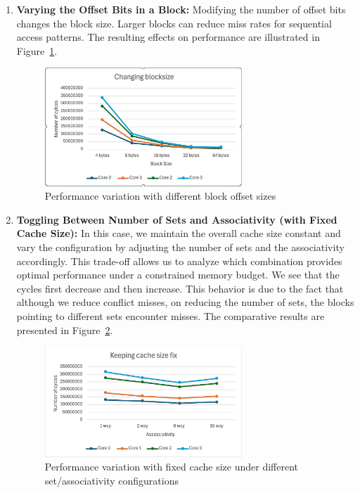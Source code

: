 \documentclass{article}
\begin{document}
\begin{enumerate}
    \item \textbf{Varying the Offset Bits in a Block:} Modifying the number of offset bits changes the block size. Larger blocks can reduce miss rates for sequential access patterns. The resulting effects on performance are illustrated in Figure~\ref{fig:offset_variation}.
    
    \begin{figure}[H]
        \centering
        \includegraphics[width=0.7\textwidth]{3.jpeg}
        \caption{Performance variation with different block offset sizes}
        \label{fig:offset_variation}
    \end{figure}

    \item \textbf{Toggling Between Number of Sets and Associativity (with Fixed Cache Size):} In this case, we maintain the overall cache size constant and vary the configuration by adjusting the number of sets and the associativity accordingly. This trade-off allows us to analyze which combination provides optimal performance under a constrained memory budget. We see that the cycles first decrease and then increase. This behavior is due to the fact that although we reduce conflict misses, on reducing the number of sets, the blocks pointing to different sets encounter misses. The comparative results are presented in Figure~\ref{fig:fixed_size_variation}.
    
    \begin{figure}[H]
        \centering
        \includegraphics[width=0.7\textwidth]{4.jpeg}
        \caption{Performance variation with fixed cache size under different set/associativity configurations}
        \label{fig:fixed_size_variation}
    \end{figure}
\end{enumerate}
\end{document}
